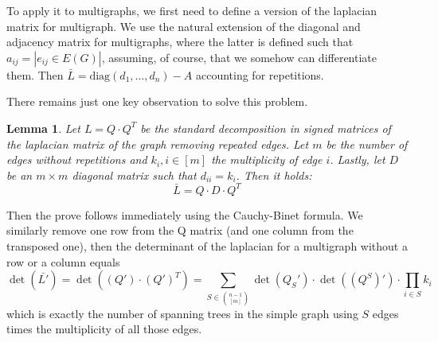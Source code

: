 \documentclass[a4paper, 10pt]{article}
\newtheorem{lemma}{Lemma}
\theoremstyle{definition} %
\begin{document}
To apply it to multigraphs, we first need to define a version of the laplacian matrix for multigraph.
We use the natural extension of the diagonal and adjacency matrix for multigraphs, where the latter is defined such that $a_{ij} = \left| e_{ij} \in E(G) \right|$, assuming, of course, that we somehow can differentiate them.
Then $\bar{L} = \text{diag}(d_1, \dots, d_n) - A$ accounting for repetitions.

There remains just one key observation to solve this problem.
\begin{lemma}
    Let $L = Q \cdot Q^T$ be the standard decomposition in signed matrices of the laplacian matrix of the graph \emph{removing} repeated edges.
    Let $m$ be the number of edges without repetitions and $k_i, i \in [m]$ the multiplicity of edge $i$.
    Lastly, let $D$ be an $m \times m$ diagonal matrix such that $d_{ii} = k_i$. Then it holds:
    $$\bar{L} = Q \cdot D \cdot Q ^T$$
\end{lemma}

Then the prove follows immediately using the Cauchy-Binet formula.
We similarly remove one row from the Q matrix (and one column from the transposed one), then the determinant of the laplacian for a multigraph without a row or a column equals
$$\det(\bar{L'}) = \det\left((Q')\cdot(Q')^T\right) = \sum_{S \in {n-1 \choose [m]}} \det\left(Q_S'\right) \cdot \det((Q^{S})') \cdot \prod_{i \in S} k_i$$
which is exactly the number of spanning trees in the simple graph using $S$ edges times the multiplicity of all those edges.
\end{document}
